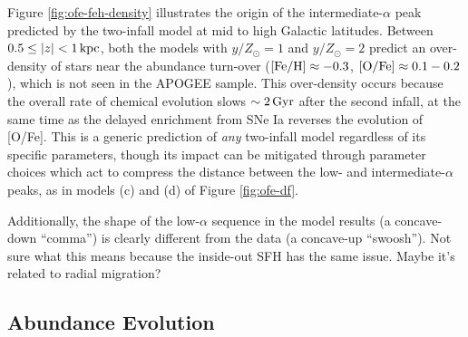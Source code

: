 \documentclass[twocolumn,twocolappendix,linenumbers]{aastex631}
\newcommand{\todo}[1]{{\color{red}#1}}
\begin{document}
Figure \ref{fig:ofe-feh-density} illustrates the origin of the intermediate-$\alpha$ peak predicted by the two-infall model at mid to high Galactic latitudes. Between $0.5\leq|z|<1\,{\rm kpc}$, both the models with $y/Z_\odot=1$ and $y/Z_\odot=2$ predict an over-density of stars near the abundance turn-over (${\rm [Fe/H]}\approx-0.3$, ${\rm [O/Fe]}\approx0.1-0.2$), which is not seen in the APOGEE sample. This over-density occurs because the overall rate of chemical evolution slows $\sim2\,{\rm Gyr}$ after the second infall, at the same time as the delayed enrichment from SNe Ia reverses the evolution of [O/Fe]. This is a generic prediction of {\it any} two-infall model regardless of its specific parameters, though its impact can be mitigated through parameter choices which act to compress the distance between the low- and intermediate-$\alpha$ peaks, as in models (c) and (d) of Figure \ref{fig:ofe-df}.

Additionally, the shape of the low-$\alpha$ sequence in the model results (a concave-down ``comma'') is clearly different from the data (a concave-up ``swoosh''). \todo{Not sure what this means because the inside-out SFH has the same issue. Maybe it's related to radial migration?}

\subsection{Abundance Evolution}
\label{sec:age-abundance}
\end{document}
